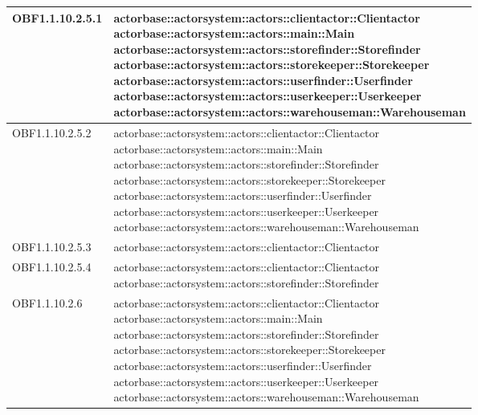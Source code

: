 \documentclass{scalatekids-article}
\begin{document}
\begin{longtable}[H]{|p{4.5cm}|p{13cm}|}
  \hline
  OBF1.1.10.2.5.1 & \multiLineCell[t]{actorbase::actorsystem::actors::clientactor::Clientactor\\actorbase::actorsystem::actors::main::Main\\actorbase::actorsystem::actors::storefinder::Storefinder\\actorbase::actorsystem::actors::storekeeper::Storekeeper\\actorbase::actorsystem::actors::userfinder::Userfinder\\actorbase::actorsystem::actors::userkeeper::Userkeeper\\actorbase::actorsystem::actors::warehouseman::Warehouseman\\}\\
  \hline
  OBF1.1.10.2.5.2 & \multiLineCell[t]{actorbase::actorsystem::actors::clientactor::Clientactor\\actorbase::actorsystem::actors::main::Main\\actorbase::actorsystem::actors::storefinder::Storefinder\\actorbase::actorsystem::actors::storekeeper::Storekeeper\\actorbase::actorsystem::actors::userfinder::Userfinder\\actorbase::actorsystem::actors::userkeeper::Userkeeper\\actorbase::actorsystem::actors::warehouseman::Warehouseman\\}\\
  \hline
  OBF1.1.10.2.5.3 & \multiLineCell[t]{actorbase::actorsystem::actors::clientactor::Clientactor\\}\\
  \hline
  OBF1.1.10.2.5.4 & \multiLineCell[t]{actorbase::actorsystem::actors::clientactor::Clientactor\\actorbase::actorsystem::actors::storefinder::Storefinder\\}\\
  \hline
  OBF1.1.10.2.6 & \multiLineCell[t]{actorbase::actorsystem::actors::clientactor::Clientactor\\actorbase::actorsystem::actors::main::Main\\actorbase::actorsystem::actors::storefinder::Storefinder\\actorbase::actorsystem::actors::storekeeper::Storekeeper\\actorbase::actorsystem::actors::userfinder::Userfinder\\actorbase::actorsystem::actors::userkeeper::Userkeeper\\actorbase::actorsystem::actors::warehouseman::Warehouseman\\}\\

\end{longtable}
\end{document}

